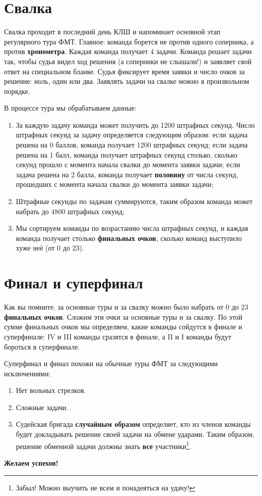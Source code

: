 \documentclass[12pt]{article}
\begin{document}
\section*{Свалка}
Свалка проходит в последний день КЛШ и напоминает основной этап регулярного тура ФМТ. Главное: команда борется не против одного соперника, а против {\bf хронометра}. Каждая команда получает 4 задачи. Команда решает задачи так, чтобы судья видел ход решения (а соперники не слышали!) и заявляет свой ответ на специальном бланке. Судья фиксирует время заявки и число очков за решение: ноль, один или два. Заявлять задачи на свалке можно в произвольном порядке.

В процессе тура мы обрабатываем данные:
\begin{enumerate}
	\item За каждую задачу команда может получить до 1200 штрафных секунд. Число штрафных секунд за задачу определяется следующим образом: если задача решена на 0 баллов, команда получает 1200 штрафных секунд; если задача решена на 1 балл, команда получает штрафных секунд столько, сколько секунд прошло с момента начала свалки до момента заявки задачи; если задача решена на 2 балла, команда получает {\bf половину} от числа секунд, прошедших с момента начала свалки до момента заявки задачи;
	\item Штрафные секунды по задачам суммируются, таким образом команда может набрать до 4800 штрафных секунд;
	\item Мы сортируем команды по возрастанию числа штрафных секунд, и каждая команда получает столько {\bf финальных очков}, сколько команд выступило хуже неё (от 0 до 23).
\end{enumerate}

\section*{Финал и суперфинал}
Как вы помните, за основные туры и за свалку можно было набрать от $0$ до $23$ {\bf финальных очков}. Сложим эти очки за основные туры и за свалку. По этой сумме финальных очков мы определяем, какие команды сойдутся в финале и суперфинале: IV и III команды сразятся в финале, а II и I команды будут бороться в суперфинале.

Суперфинал и финал похожи на обычные туры ФМТ за следующими исключениями:
\begin{enumerate}
\item Нет вольных стрелков.
\item Сложные задачи.
\item Судейская бригада {\bf случайным образом} определяет, кто из членов команды будет докладывать решение своей задачи на обмене ударами. Таким образом, решение обменной задачи должны знать {\bf все} участники\footnote{Забыл! Можно выучить не всем и понадеяться на удачу!}.
\end{enumerate}

\begin{center}
\Large \bf
Желаем успехов!
\end{center}
\end{document}
